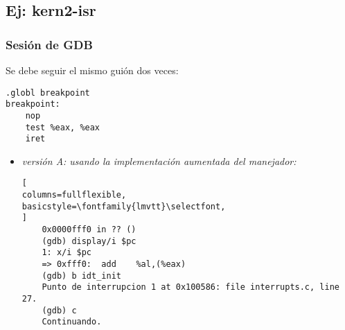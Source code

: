 \documentclass[a4paper, 12pt]{article}
\begin{document}
		\subsection{Ej: kern2-isr}
			\subsubsection{Sesión de GDB}
			Se debe seguir el mismo guión dos veces:\\
\begin{lstlisting}
.globl breakpoint
breakpoint:
	nop
	test %eax, %eax
	iret
\end{lstlisting}
			\begin{itemize}
				\item \textit{versión A: usando la implementación aumentada
				del manejador:}
\begin{lstlisting}[
columns=fullflexible,
basicstyle=\fontfamily{lmvtt}\selectfont,
]
	0x0000fff0 in ?? ()
	(gdb) display/i $pc
	1: x/i $pc
	=> 0xfff0:	add    %al,(%eax)
	(gdb) b idt_init
	Punto de interrupcion 1 at 0x100586: file interrupts.c, line 27.
	(gdb) c
	Continuando.


\end{lstlisting}
\end{itemize}
\end{document}
